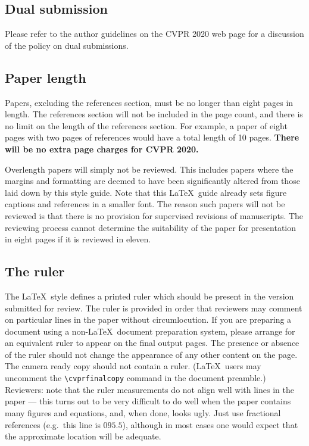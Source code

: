 \documentclass[10pt,twocolumn,letterpaper]{article}
\begin{document}
\subsection{Dual submission}

Please refer to the author guidelines on the CVPR 2020 web page for a
discussion of the policy on dual submissions.

\subsection{Paper length}
Papers, excluding the references section,
must be no longer than eight pages in length. The references section
will not be included in the page count, and there is no limit on the
length of the references section. For example, a paper of eight pages
with two pages of references would have a total length of 10 pages.
{\bf There will be no extra page charges for CVPR 2020.}

Overlength papers will simply not be reviewed.  This includes papers
where the margins and formatting are deemed to have been significantly
altered from those laid down by this style guide.  Note that this
\LaTeX\ guide already sets figure captions and references in a smaller font.
The reason such papers will not be reviewed is that there is no provision for
supervised revisions of manuscripts.  The reviewing process cannot determine
the suitability of the paper for presentation in eight pages if it is
reviewed in eleven.  

\subsection{The ruler}
The \LaTeX\ style defines a printed ruler which should be present in the
version submitted for review.  The ruler is provided in order that
reviewers may comment on particular lines in the paper without
circumlocution.  If you are preparing a document using a non-\LaTeX\
document preparation system, please arrange for an equivalent ruler to
appear on the final output pages.  The presence or absence of the ruler
should not change the appearance of any other content on the page.  The
camera ready copy should not contain a ruler. (\LaTeX\ users may uncomment
the \verb'\cvprfinalcopy' command in the document preamble.)  Reviewers:
note that the ruler measurements do not align well with lines in the paper
--- this turns out to be very difficult to do well when the paper contains
many figures and equations, and, when done, looks ugly.  Just use fractional
references (e.g.\ this line is $095.5$), although in most cases one would
expect that the approximate location will be adequate.
\end{document}
